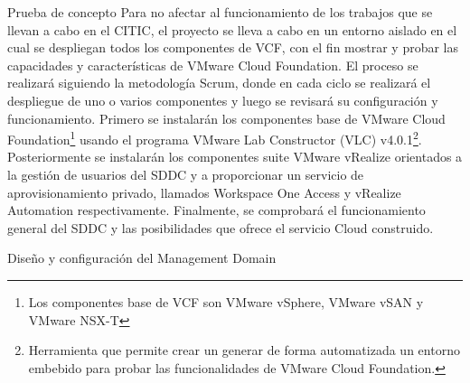 \begin{section}{Prueba de concepto}
Para no afectar al funcionamiento de los trabajos que se llevan a cabo en el CITIC, el proyecto se lleva a cabo en un entorno aislado en el cual se despliegan todos los componentes de VCF, con el fin mostrar y probar las capacidades y características de VMware Cloud Foundation. 
El proceso se realizará siguiendo la metodología Scrum, donde en cada ciclo se realizará el despliegue de uno o varios componentes y luego se revisará su configuración y funcionamiento. Primero se instalarán los componentes base de VMware Cloud Foundation\footnote{Los componentes base de VCF son VMware vSphere, VMware vSAN y VMware NSX-T} usando el programa VMware Lab Constructor (VLC) v4.0.1\footnote{Herramienta que permite crear un generar de forma automatizada un entorno embebido para probar las funcionalidades de VMware Cloud Foundation.}. Posteriormente se instalarán los componentes suite VMware vRealize orientados a la gestión de usuarios del SDDC y a proporcionar un servicio de aprovisionamiento privado, llamados Workspace One Access y vRealize Automation respectivamente. Finalmente, se comprobará el funcionamiento general del SDDC y las posibilidades que ofrece el servicio Cloud construido.



\begin{subsection}{Diseño y configuración del Management Domain}


\end{subsection}

\end{section}